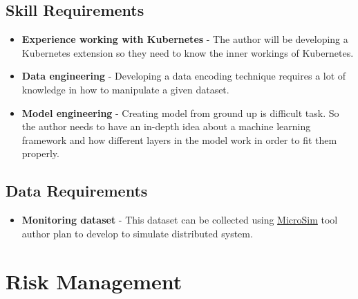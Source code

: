 \subsection{Skill Requirements}
\begin{itemize}[noitemsep,nolistsep] 
    \item \textbf{Experience working with Kubernetes} - The author will be developing a Kubernetes extension so they need to know the inner workings of Kubernetes.
    \item \textbf{Data engineering} -  Developing a data encoding technique requires a lot of knowledge in how to manipulate a given dataset.
    \item \textbf{Model engineering} - Creating model from ground up is difficult task. So the author needs to have an in-depth idea about a machine learning framework and how different layers in the model work in order to fit them properly. 
\end{itemize}

\subsection{Data Requirements}
\begin{itemize}[noitemsep,nolistsep] 
\item \textbf{Monitoring dataset} -  This dataset can be collected using \hyperref[microsim]{MicroSim} tool author plan to develop to simulate distributed system.
\end{itemize}

\section{Risk Management}


